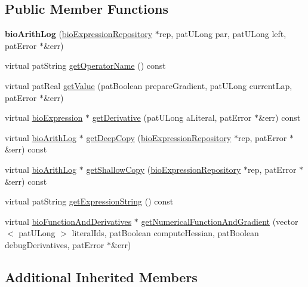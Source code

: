 \subsection*{Public Member Functions}
\begin{DoxyCompactItemize}
\item 
\mbox{\label{classbio_arith_log_ae5ac1a21d303fd067ea927f46e41ad5d}} 
{\bfseries bio\+Arith\+Log} (\hyperlink{classbio_expression_repository}{bio\+Expression\+Repository} $\ast$rep, pat\+U\+Long par, pat\+U\+Long left, pat\+Error $\ast$\&err)
\item 
virtual pat\+String \hyperlink{classbio_arith_log_a730e174a4e9509dccb32c3fab690a46c}{get\+Operator\+Name} () const
\item 
virtual pat\+Real \hyperlink{classbio_arith_log_a31c9d372354ff2f971caffc594c555a9}{get\+Value} (pat\+Boolean prepare\+Gradient, pat\+U\+Long current\+Lap, pat\+Error $\ast$\&err)
\item 
virtual \hyperlink{classbio_expression}{bio\+Expression} $\ast$ \hyperlink{classbio_arith_log_aeb045e82ab8f0c99919b83102d71c527}{get\+Derivative} (pat\+U\+Long a\+Literal, pat\+Error $\ast$\&err) const
\item 
virtual \hyperlink{classbio_arith_log}{bio\+Arith\+Log} $\ast$ \hyperlink{classbio_arith_log_a1717f06ff8d70f5285272ee66c669174}{get\+Deep\+Copy} (\hyperlink{classbio_expression_repository}{bio\+Expression\+Repository} $\ast$rep, pat\+Error $\ast$\&err) const
\item 
virtual \hyperlink{classbio_arith_log}{bio\+Arith\+Log} $\ast$ \hyperlink{classbio_arith_log_aff0739f0c0576b9e70b7192e3e5baf2a}{get\+Shallow\+Copy} (\hyperlink{classbio_expression_repository}{bio\+Expression\+Repository} $\ast$rep, pat\+Error $\ast$\&err) const
\item 
virtual pat\+String \hyperlink{classbio_arith_log_a5deea723cf9e2b50dc4f6c61a6b82090}{get\+Expression\+String} () const
\item 
virtual \hyperlink{classbio_function_and_derivatives}{bio\+Function\+And\+Derivatives} $\ast$ \hyperlink{classbio_arith_log_a875351accd5a515a1d3452dea45a354d}{get\+Numerical\+Function\+And\+Gradient} (vector$<$ pat\+U\+Long $>$ literal\+Ids, pat\+Boolean compute\+Hessian, pat\+Boolean debug\+Derivatives, pat\+Error $\ast$\&err)
\end{DoxyCompactItemize}
\subsection*{Additional Inherited Members}


